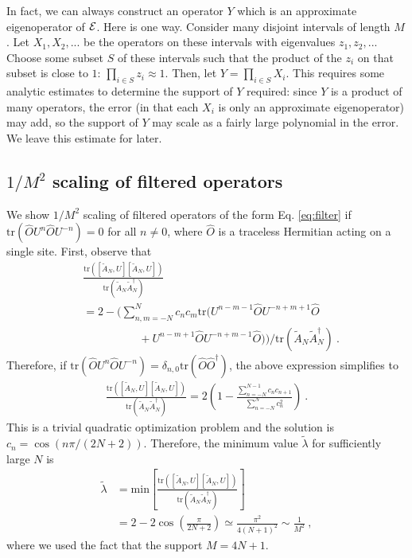 \documentclass[twocolumn,superscriptaddress, prb]{revtex4-1}
\begin{document}
In fact, we can always construct an operator $Y$ which is an approximate eigenoperator of ${\cal E}$.  Here is one way.  Consider many disjoint intervals of length $M$.  Let $X_1,X_2,...$ be the operators on these intervals with eigenvalues $z_1,z_2,...$  Choose some subset $S$ of these intervals such that the product of the $z_i$ on that subset is close to $1$: $\prod_{i \in S} z_i \approx 1$.  Then, let $Y=\prod_{i \in S} X_i$.  This requires some analytic estimates to determine the support of $Y$ required: since $Y$ is a product of many operators, the error (in that each $X_i$ is only an approximate eigenoperator) may add, so the support of $Y$ may scale as a fairly large polynomial in the error.  We leave this estimate for later.

\subsection{$1/M^2$ scaling of filtered operators}
We show $1/M^2$ scaling of filtered operators of the form Eq. \eqref{eq:filter} if $\mathrm{tr}(\hat{O}U^n \hat{O}U^{-n}) = 0$ for all $n\neq 0$,
where $\hat{O}$ is a traceless Hermitian acting on a single site.
First, observe that
\begin{align}
& \frac{\mathrm{tr}([\tilde{A}_N,U][\tilde{A}_N,U])}{\mathrm{tr}(\tilde{A}_N\tilde{A}_N^\dag)} \nonumber\\
&=2 - \bigg(\sum_{n,m = -N}^{N}c_n c_m \mathrm{tr}(U^{n-m-1}\hat{O}U^{-n+m+1}\hat{O} \nonumber\\
&\quad\quad\quad\quad\quad + U^{n-m+1}\hat{O}U^{-n+m-1}\hat{O})\bigg)/\mathrm{tr}(\tilde{A}_N\tilde{A}_N^\dag) ~.
\end{align}
Therefore, if $\mathrm{tr}(\hat{O}U^n \hat{O}U^{-n}) = \delta_{n,0}\mathrm{tr}(\hat{O}\hat{O}^\dag)$,
the above expression simplifies to
\begin{align}
\frac{\mathrm{tr}([\tilde{A}_N,U][\tilde{A}_N,U])}{\mathrm{tr}(\tilde{A}_N\tilde{A}_N^\dag)}=2\left(1 - \frac{\sum_{n=-N}^{N-1}c_n c_{n+1}}{\sum_{n=-N}^N c_n^2}\right) ~.
\end{align}
This is a trivial quadratic optimization problem and the solution is $c_n = \cos(n\pi/(2N+2))$.
Therefore, the minimum value $\tilde{\lambda}$ for sufficiently large $N$ is
\begin{align}
\tilde{\lambda} &= \mathrm{min}\left[\frac{\mathrm{tr}([\tilde{A}_N,U][\tilde{A}_N,U])}{\mathrm{tr}(\tilde{A}_N\tilde{A}_N^\dag)} \right] \nonumber\\
&= 2 - 2\cos\left(\frac{\pi}{2N+2}\right) \simeq \frac{\pi^2}{4(N+1)^2} \sim \frac{1}{M^2} ~,
\end{align}
where we used the fact that the support $M = 4N +1 $.
\end{document}
